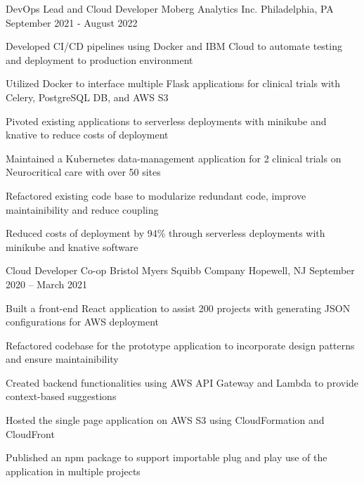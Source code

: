 \begin{cventries}
  \cventry
  {DevOps Lead and Cloud Developer}
  {Moberg Analytics Inc.}
  {Philadelphia, PA}
  {September 2021 - August 2022}
  {\begin{cvitems}
	  \item {Developed CI/CD pipelines using Docker and IBM Cloud to automate testing and deployment to production environment}
	  \item {Utilized Docker to interface multiple Flask applications for clinical trials with Celery, PostgreSQL DB, and AWS S3}
	  \item {Pivoted existing applications to serverless deployments with minikube and knative to reduce costs of deployment}
	  \item {Maintained a Kubernetes data-management application for 2 clinical trials on Neurocritical care with over 50 sites}
	  \item {Refactored existing code base to modularize redundant code, improve maintainibility and reduce coupling}
	  \item {Reduced costs of deployment by 94\% through serverless deployments with minikube and knative software}
	  \end{cvitems}}
  

  \cventry
  {Cloud Developer Co-op}
  {Bristol Myers Squibb Company}
  {Hopewell, NJ}
  {September 2020 – March 2021}
  {\begin{cvitems}
	  \item {Built a front-end React application to assist 200 projects with generating JSON configurations for AWS deployment}
	  \item {Refactored codebase for the prototype application to incorporate design patterns and ensure maintainibility}
	  \item {Created backend functionalities using AWS API Gateway and Lambda to provide context-based suggestions}
	  \item {Hosted the single page application on AWS S3 using CloudFormation and CloudFront}
	  \item {Published an npm package to support importable plug and play use of the application in multiple projects}
	  \end{cvitems}}
  

\end{cventries}
